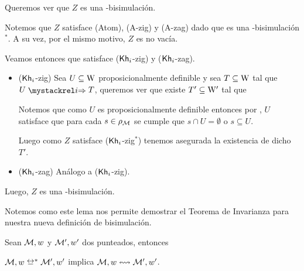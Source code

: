\begin{demostracion}
    Queremos ver que $Z$ es una \KHilogic-bisimulación.

    Notemos que $Z$ satisface (Atom), (A-zig) y (A-zag) dado que es una \KHilogic-bisimulación$^*$. A su vez, por el mismo motivo, $Z$ 
    es no vacía.

    Veamos entonces que satisface ($\mathsf{Kh}_i$-zig) y ($\mathsf{Kh}_i$-zag).

    \begin{itemize}
        \item ($\mathsf{Kh}_i$-zig) Sea $U \subseteq \mathrm{W}$ proposicionalmente definible y sea $T \subseteq \mathrm{W}$ tal que $U \ultsExecAgi T$, queremos ver que existe
        $T' \subseteq \mathrm{W}'$ tal que

        \begin{multicols}{2}
        \end{multicols}
        Notemos que como $U$ es proposicionalmente definible entonces por , $U$ satisface que para cada $s \in \rho_{\mathcal{M}}$ se cumple
        que $s \cap U = \emptyset$ o $s \subseteq U$.
    
        Luego como $Z$ satisface ($\mathsf{Kh}_i$-zig$^*$) tenemos asegurada la existencia de dicho $T'$.
    
        \item ($\mathsf{Kh}_i$-zag) Análogo a ($\mathsf{Kh}_i$-zig).
    \end{itemize}

    Luego, $Z$ es una \KHilogic-bisimulación.
\end{demostracion}

Notemos como este lema nos permite demostrar el Teorema de Invarianza para nuestra nueva definición de bisimulación.

\begin{teorema}
    Sean $\mathcal{M},w$ y $\mathcal{M}',w'$ dos \ultss punteados, entonces
    \begin{center}
        $\modults,w \bisim^* \modults',w'$ implica $\mathcal{M},w \mathrel{\leftrightsquigarrow} \mathcal{M}',w'$.
    \end{center}
\end{teorema}


